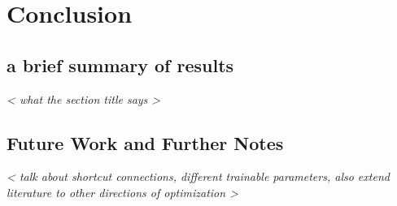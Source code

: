 \chapter{Conclusion}
\section{a brief summary of results}
\emph{ < what the section title says > }

\section{Future Work and Further Notes}

\emph{ < talk about shortcut connections, different trainable parameters, also extend literature to other directions of optimization > }
